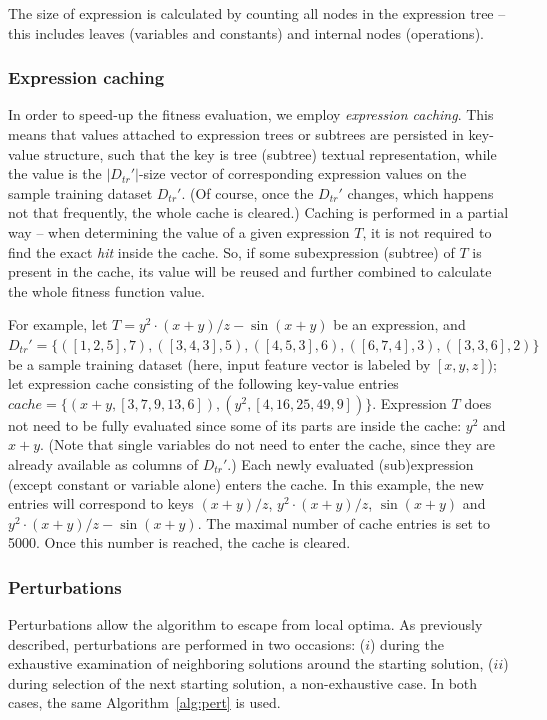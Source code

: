 \documentclass{bmcart}
\begin{document}
The size of expression is calculated by counting all nodes in the expression tree -- this includes leaves (variables and constants) and internal nodes (operations). 

\subsubsection{Expression caching}

In order to speed-up the fitness evaluation, we employ \emph{expression caching}. This means that values attached to expression trees or subtrees are persisted in key-value structure, such that the key is tree (subtree) textual representation, while the value is the $|D_{tr}'|$-size  vector of corresponding expression values on the sample training dataset $D_{tr}'$. (Of course, once the $D_{tr}'$ changes, which happens not that frequently, the whole cache is cleared.) 
Caching is performed in a partial way -- when determining the value of a given expression $T$, it is not required to find the exact \emph{hit} inside the cache. So, if some subexpression (subtree) of $T$ is present in the cache, its value will be reused and further combined to calculate the whole fitness function value. 

For example, let  $T = y^2 \cdot (x+y)/z - \sin(x+y)$ be an expression, and $D_{tr}'=\{([1, 2, 5], 7), ([3, 4, 3], 5), ([4, 5, 3], 6), ([6, 7, 4], 3), ([3, 3, 6], 2)\}$ be a sample training dataset (here, input feature vector is labeled by $[x, y, z]$); let expression cache consisting of the following key-value entries $cache=\{(x+y, [3, 7, 9, 13, 6]), (y^2, [4, 16, 25, 49, 9])\}$.  
Expression $T$ does not need to be fully evaluated since some of its parts are inside the cache: $y^2$ and $x+y$. (Note that single variables do not need to enter the cache, since they are already available as columns of  $D_{tr}'$.)
Each newly evaluated (sub)expression (except constant or variable alone) enters the cache. In this example, the new entries will correspond to keys $(x+y)/z$, $y^2 \cdot (x+y)/z$, $\sin(x+y)$ and $y^2 \cdot (x+y)/z - \sin(x+y)$.  
The maximal number of cache entries is set to 5000. Once this number is reached, the cache is cleared. 

\subsubsection{Perturbations}\label{sec:pertGen}

Perturbations allow the algorithm to escape from local optima. As previously described, perturbations are performed in two occasions: ($i$) during the exhaustive examination of neighboring solutions around the starting solution, ($ii$) during selection of the next starting solution, a non-exhaustive case.  
In both cases, the same Algorithm~\ref{alg:pert} is used. 
\end{document}
